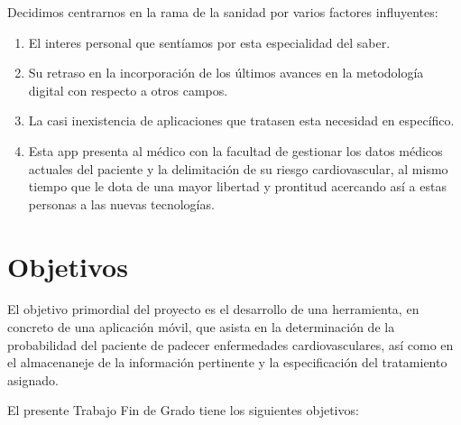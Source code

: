 \documentclass[11pt,spanish,
		listoftables,listoffigures]
		{tfgplantilla}
\begin{document}
Decidimos centrarnos en la rama de la sanidad por varios factores influyentes:

\begin{enumerate}
	\item El interes personal que sentíamos por esta especialidad del saber.

	\item Su retraso en la incorporación de los últimos avances en la metodología digital con respecto a otros campos.

	\item La casi inexistencia de aplicaciones que tratasen esta necesidad en específico.
	\item Esta app presenta al médico con la facultad de gestionar los datos médicos actuales del paciente y la delimitación de su riesgo cardiovascular, al mismo tiempo que le dota de una mayor libertad y prontitud acercando así a estas personas a las nuevas tecnologías.
\end{enumerate}

\section{Objetivos}

El objetivo primordial del proyecto es el desarrollo de una herramienta, en concreto de una aplicación móvil, que asista en la determinación de la probabilidad del paciente de padecer enfermedades cardiovasculares, así como en el almacenaneje de la información pertinente y la especificación del tratamiento asignado.

El presente Trabajo Fin de Grado tiene los siguientes objetivos:
\end{document}
